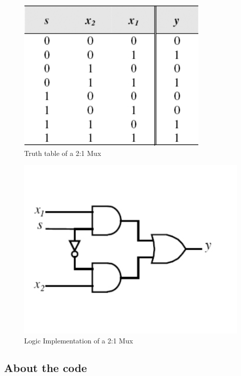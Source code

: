 \begin{figure}[H]
  \begin{centering}
  \includegraphics[scale=1]{muxtable.png}
  \par\end{centering}
  \caption{Truth table of a 2:1 Mux}
\end{figure}

\begin{figure}[H]
  \begin{centering}
  \includegraphics[scale=1]{muxlogic.png}
  \par\end{centering}
  \caption{Logic Implementation of a 2:1 Mux}
\end{figure}


\subsection*{About the code}

